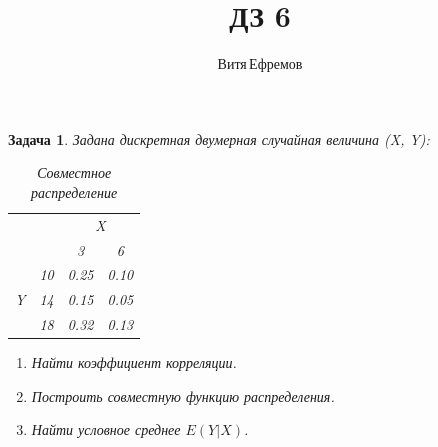 \documentclass[a4paper,12pt]{article}
\newtheorem{problem}{Задача}
\begin{document}
\title{ДЗ 6}
\author{Витя\,Ефремов}
\maketitle

\begin{problem}
Задана дискретная двумерная случайная величина (X, Y):
\begin{table}[h!]
\centering
\begin{tabular}{|c|c|c|c|}
    \hline
    \multicolumn{2}{|c|}{} & \multicolumn{2}{c|}{X} \\ \cline{3-4}
    \multicolumn{2}{|c|}{} & 3 & 6 \\ \hline
    \multirow{3}{*}{Y} & 10 & 0.25 & 0.10 \\ \cline{2-4}
    & 14 & 0.15 & 0.05 \\ \cline{2-4}
    & 18 & 0.32 & 0.13 \\ \hline
\end{tabular}
\caption{Совместное распределение}
\end{table}

\begin{enumerate}
    \item Найти коэффициент корреляции.
    \item Построить совместную функцию распределения.
    \item Найти условное среднее $E(Y | X)$.
\end{enumerate}

\end{problem}
\end{document}
